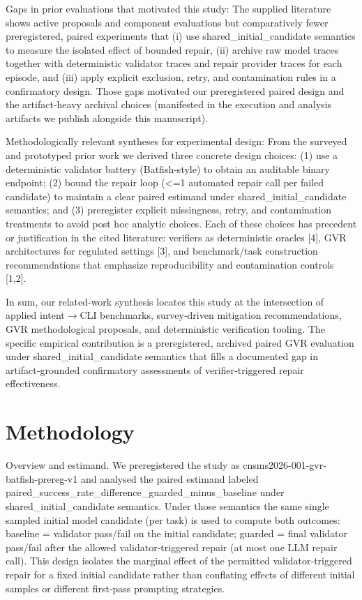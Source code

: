\documentclass[conference]{IEEEtran}
\begin{document}
Gaps in prior evaluations that motivated this study: The supplied literature shows active proposals and component evaluations but comparatively fewer preregistered, paired experiments that (i) use shared\_initial\_candidate semantics to measure the isolated effect of bounded repair, (ii) archive raw model traces together with deterministic validator traces and repair provider traces for each episode, and (iii) apply explicit exclusion, retry, and contamination rules in a confirmatory design. Those gaps motivated our preregistered paired design and the artifact‑heavy archival choices (manifested in the execution and analysis artifacts we publish alongside this manuscript).

Methodologically relevant syntheses for experimental design: From the surveyed and prototyped prior work we derived three concrete design choices: (1) use a deterministic validator battery (Batfish‑style) to obtain an auditable binary endpoint; (2) bound the repair loop (<=1 automated repair call per failed candidate) to maintain a clear paired estimand under shared\_initial\_candidate semantics; and (3) preregister explicit missingness, retry, and contamination treatments to avoid post hoc analytic choices. Each of these choices has precedent or justification in the cited literature: verifiers as deterministic oracles [4], GVR architectures for regulated settings [3], and benchmark/task construction recommendations that emphasize reproducibility and contamination controls [1,2].

In sum, our related‑work synthesis locates this study at the intersection of applied intent\ensuremath{\rightarrow}CLI benchmarks, survey‑driven mitigation recommendations, GVR methodological proposals, and deterministic verification tooling. The specific empirical contribution is a preregistered, archived paired GVR evaluation under shared\_initial\_candidate semantics that fills a documented gap in artifact‑grounded confirmatory assessments of verifier‑triggered repair effectiveness.

\section{Methodology}
Overview and estimand.  We preregistered the study as cnsms2026-001-gvr-batfish-prereg-v1 and analysed the paired estimand labeled paired\_success\_rate\_difference\_guarded\_minus\_baseline under shared\_initial\_candidate semantics. Under those semantics the same single sampled initial model candidate (per task) is used to compute both outcomes: baseline = validator pass/fail on the initial candidate; guarded = final validator pass/fail after the allowed validator‑triggered repair (at most one LLM repair call). This design isolates the marginal effect of the permitted validator‑triggered repair for a fixed initial candidate rather than conflating effects of different initial samples or different first‑pass prompting strategies.
\end{document}
